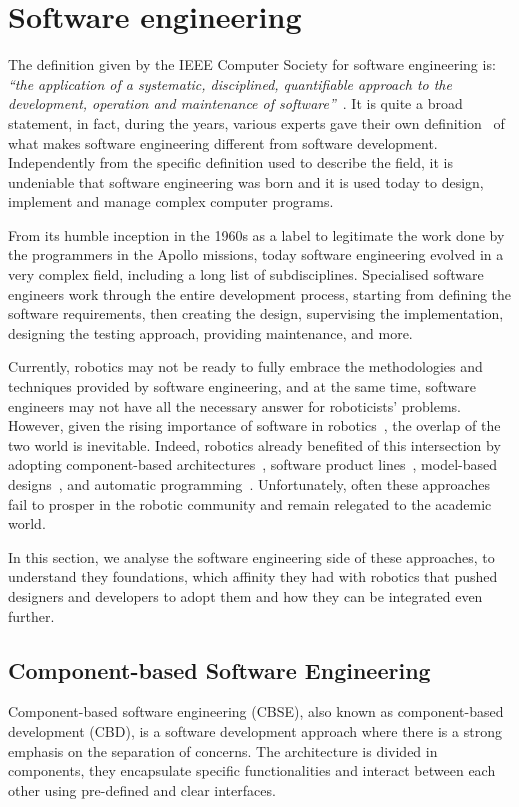 \newpage

\section{Software engineering}
The definition given by the IEEE Computer Society for software engineering is: \textit{``the application of a systematic, disciplined, quantifiable approach to the development, operation and maintenance of software''}~\cite{abran2004software}. It is quite a broad statement, in fact, during the years, various experts gave their own definition~\cite{sommerville2011software, ieee1990ieee, pressman2005software} of what makes software engineering different from software development. Independently from the specific definition used to describe the field, it is undeniable that software engineering was born and it is used today to design, implement and manage complex computer programs.

From its humble inception in the 1960s as a label to legitimate the work done by the programmers in the Apollo missions, today software engineering evolved in a very complex field, including a long list of subdisciplines. Specialised software engineers work through the entire development process, starting from defining the software requirements, then creating the design, supervising the implementation, designing the testing approach, providing maintenance, and more.

Currently, robotics may not be ready to fully embrace the methodologies and techniques provided by software engineering, and at the same time, software engineers may not have all the necessary answer for roboticists' problems. However, given the rising importance of software in robotics~\cite{cousins2011exponential}, the overlap of the two world is inevitable. Indeed, robotics already benefited of this intersection by adopting component-based architectures~\cite{quigley2009ros, schlegel2014smartmdsd}, software product lines~\cite{gherardi2014modeling}, model-based designs~\cite{diego2010v3cmm}, and automatic programming~\cite{kumar2016rosmod}. Unfortunately, often these approaches fail to prosper in the robotic community and remain relegated to the academic world.

In this section, we analyse the software engineering side of these approaches, to understand they foundations, which affinity they had with robotics that pushed designers and developers to adopt them and how they can be integrated even further.

\subsection{Component-based Software Engineering}
Component-based software engineering (CBSE), also known as component-based development (CBD), is a software development approach where there is a strong emphasis on the separation of concerns. The architecture is divided in components, they encapsulate specific functionalities and interact between each other using pre-defined and clear interfaces.

